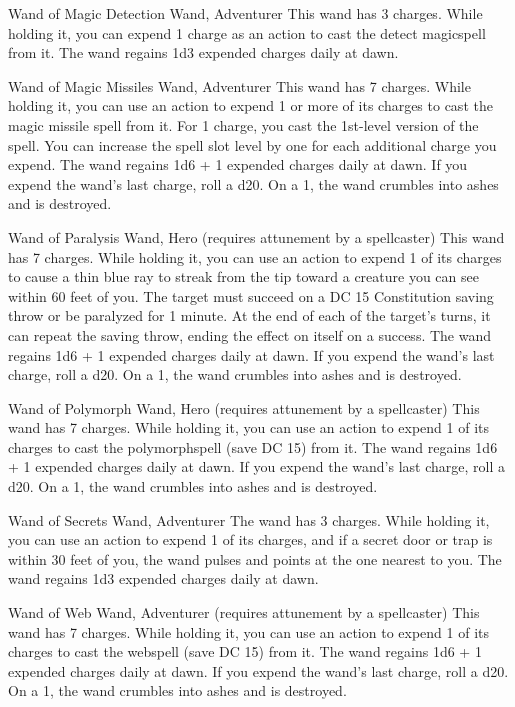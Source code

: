 Wand of Magic Detection
Wand, Adventurer This wand has 3 charges. While holding it, you can expend 1 charge as an action to cast the detect magicspell from it. The wand regains 1d3 expended charges daily at dawn.

Wand of Magic Missiles
Wand, Adventurer This wand has 7 charges. While holding it, you can use an action to expend 1 or more of its charges to cast the magic missile spell from it. For 1 charge, you cast the 1st-level version of the spell. You can increase the spell slot level by one for each additional charge you expend.  The wand regains 1d6 + 1 expended charges daily at dawn. If you expend the wand's last charge, roll a d20. On a 1, the wand crumbles into ashes and is destroyed.

Wand of Paralysis
Wand, Hero (requires attunement by a spellcaster) This wand has 7 charges. While holding it, you can use an action to expend 1 of its charges to cause a thin blue ray to streak from the tip toward a creature you can see within 60 feet of you. The target must succeed on a DC 15 Constitution saving throw or be paralyzed for 1 minute. At the end of each of the target's turns, it can repeat the saving throw, ending the effect on itself on a success.  The wand regains 1d6 + 1 expended charges daily at dawn. If you expend the wand's last charge, roll a d20. On a 1, the wand crumbles into ashes and is destroyed.

Wand of Polymorph
Wand, Hero (requires attunement by a spellcaster)
This wand has 7 charges. While holding it, you can use an action to expend 1 of its charges to cast the
polymorphspell (save DC 15) from it.
The wand regains 1d6 + 1 expended charges daily at dawn. If you expend the wand's last charge, roll a d20. On a 1, the wand crumbles into ashes and is destroyed.

Wand of Secrets
Wand, Adventurer
The wand has 3 charges. While holding it, you can use an action to expend 1 of its charges, and if a secret door or trap is within 30 feet of you, the wand pulses and points at the one nearest to you. The wand regains 1d3 expended charges daily at dawn.

Wand of Web
Wand, Adventurer (requires attunement by a spellcaster)
This wand has 7 charges. While holding it, you can use an action to expend 1 of its charges to cast the
webspell (save DC 15) from it.
The wand regains 1d6 + 1 expended charges daily at dawn. If you expend the wand's last charge, roll a d20. On a 1, the wand crumbles into ashes and is destroyed.

